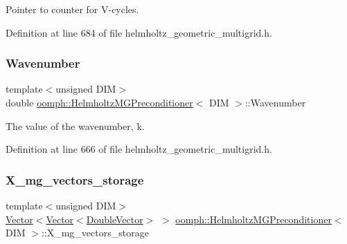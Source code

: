 Pointer to counter for V-\/cycles. 



Definition at line 684 of file helmholtz\+\_\+geometric\+\_\+multigrid.\+h.

\mbox{\label{classoomph_1_1HelmholtzMGPreconditioner_ab20414b53c2e1a576da68c50a3b89e5e}} 
\subsubsection{\texorpdfstring{Wavenumber}{Wavenumber}}
{\footnotesize\ttfamily template$<$unsigned D\+IM$>$ \\
double \hyperlink{classoomph_1_1HelmholtzMGPreconditioner}{oomph\+::\+Helmholtz\+M\+G\+Preconditioner}$<$ D\+IM $>$\+::Wavenumber\hspace{0.3cm}{\ttfamily [private]}}



The value of the wavenumber, k. 



Definition at line 666 of file helmholtz\+\_\+geometric\+\_\+multigrid.\+h.

\mbox{\label{classoomph_1_1HelmholtzMGPreconditioner_a636cb6f321d27cb892d61d7cdddd9338}} 
\subsubsection{\texorpdfstring{X\+\_\+mg\+\_\+vectors\+\_\+storage}{X\_mg\_vectors\_storage}}
{\footnotesize\ttfamily template$<$unsigned D\+IM$>$ \\
\hyperlink{classoomph_1_1Vector}{Vector}$<$\hyperlink{classoomph_1_1Vector}{Vector}$<$\hyperlink{classoomph_1_1DoubleVector}{Double\+Vector}$>$ $>$ \hyperlink{classoomph_1_1HelmholtzMGPreconditioner}{oomph\+::\+Helmholtz\+M\+G\+Preconditioner}$<$ D\+IM $>$\+::X\+\_\+mg\+\_\+vectors\+\_\+storage\hspace{0.3cm}{\ttfamily [private]}}




